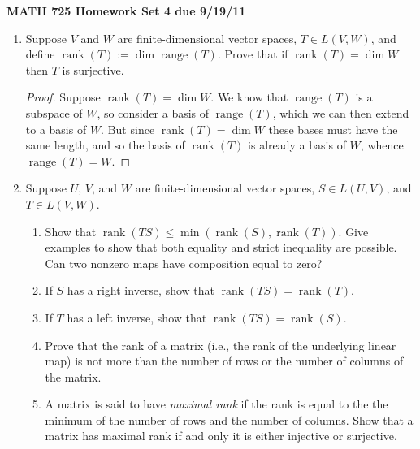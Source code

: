 \documentclass[11pt]{amsart}
\begin{document}
\setlength{\parindent}{0pt}
\setlength{\parskip}{0.4cm}
\thispagestyle{empty} 
\def\0{\mathbf 0}
\def\u{\mathbf u}
\def\v{\mathbf v}
\def\C{\mathbf{C}}
\def\F{\mathbf{F}}
\def\R{\mathbf{R}}
\def\Z{\mathbf{Z}}
\def\P{\mathcal{P}}
\newcommand\spn{\operatorname{span}}
\renewcommand\null{\operatorname{null}}
\newcommand\range{\operatorname{range}}
\newcommand\rank{\operatorname{rank}}

\begin{center} {\bf MATH 725 \qquad \qquad Homework Set 4 \qquad \qquad due 9/19/11} \end{center} 

\begin{enumerate}[(1)]

\item Suppose $V$ and $W$ are finite-dimensional vector spaces, $T \in L(V,W)$, and define $\rank(T) := \dim \range (T)$. Prove that if $\rank(T) = \dim W$ then $T$ is surjective.

\begin{proof}
Suppose $\rank(T) = \dim W$.
We know that $\range(T)$ is a subspace of $W$, so consider a basis of $\range(T)$, which we can then extend to a basis of $W$. But since $\rank(T) = \dim W$ these bases must have the same length, and so the basis of $\rank(T)$ is already a basis of $W$, whence $\range(T) = W$.
\end{proof}

\item Suppose $U$, $V$, and $W$ are finite-dimensional vector spaces, $S \in L(U,V)$, and $T \in L(V,W)$.
  \begin{enumerate}
  \item Show that $\rank(TS) \le \min(\rank(S), \rank(T ))$. 
  Give examples to show that both equality and strict inequality are possible. 
  Can two nonzero maps have composition equal to zero?
  \item If $S$ has a right inverse, show that $\rank(T S) = \rank(T )$.
  \item If $T$ has a left inverse, show that $\rank(TS) = \rank(S)$.
  \item Prove that the rank of a matrix (i.e., the rank of the underlying linear map) is not more than the number of rows or the number of columns of the matrix.
  \item A matrix is said to have \emph{maximal rank} if the rank is equal to the the minimum of the number of rows and the number of columns. Show that a matrix has maximal rank if and only it is either injective or surjective.
  \end{enumerate}


\end{enumerate}
\end{document}
